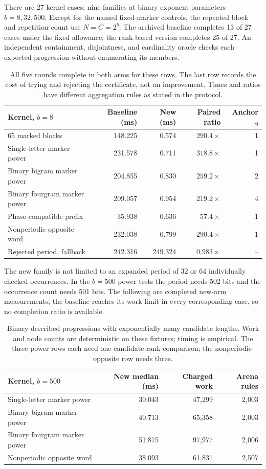 There are 27 kernel cases: nine families at binary exponent parameters
$b=8,32,500$. Except for the named fixed-marker controls, the repeated block
and repetition count use $N=C=2^b$. The archived baseline completes
13 of 27 cases under the fixed allowance; the rank-based version completes
25 of 27. An independent containment, disjointness, and cardinality oracle
checks each expected progression without enumerating its members.

\begin{table}[htbp]
\centering\small
\begin{tabular}{@{}lrrrr@{}}
\toprule
Kernel, $b=8$ & Baseline (ms) & New (ms) & Paired ratio & Anchor $q$\\
\midrule
65 marked blocks & 148.225 & 0.574 & $290.4\times$ & 1\\
Single-letter marker power & 231.578 & 0.711 & $318.8\times$ & 1\\
Binary bigram marker power & 204.855 & 0.830 & $259.2\times$ & 2\\
Binary fourgram marker power & 209.057 & 0.954 & $219.2\times$ & 4\\
Phase-compatible prefix & 35.938 & 0.636 & $57.4\times$ & 1\\
Nonperiodic opposite word & 232.038 & 0.799 & $290.4\times$ & 1\\
Rejected period, fallback & 242.316 & 249.324 & $0.983\times$ & --\\
\bottomrule
\end{tabular}
\caption{All five rounds complete in both arms for these rows. The last row
records the cost of trying and rejecting the certificate, not an improvement.
Times and ratios have different aggregation rules as stated in the protocol.}
\label{tab:endpoint-small}
\end{table}

The new family is not limited to an expanded period of 32 or 64 individually
checked occurrences. In the $b=500$ power tests the period needs 502 bits
and the occurrence count needs 501 bits. The following are completed new-arm
measurements; the baseline reaches its work limit in every corresponding
case, so no completion ratio is available.

\begin{table}[htbp]
\centering\small
\begin{tabular}{@{}lrrr@{}}
\toprule
Kernel, $b=500$ & New median (ms) & Charged work & Arena rules\\
\midrule
Single-letter marker power & 30.043 & 47,299 & 2,003\\
Binary bigram marker power & 40.713 & 65,358 & 2,003\\
Binary fourgram marker power & 51.875 & 97,977 & 2,006\\
Nonperiodic opposite word & 38.093 & 61,831 & 2,507\\
\bottomrule
\end{tabular}
\caption{Binary-described progressions with exponentially many candidate
lengths. Work and node counts are deterministic on these fixtures; timing
is empirical. The three power rows each need one candidate-rank comparison;
the nonperiodic-opposite row needs three.}
\label{tab:endpoint-huge}
\end{table}

